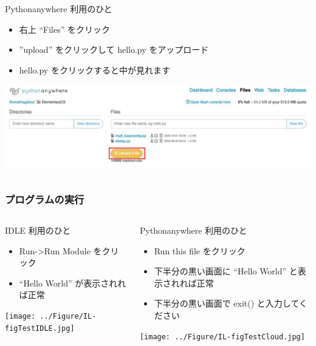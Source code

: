 \begin{frame}
\begin{columns}[t]
\begin{column}{0.5\textwidth}
\begin{itembox}{\footnotesize Pythonanywhere 利用のひと}
\begin{itemize}
\item 右上 ``Files'' をクリック
\item ''upload'' をクリックして hello.py をアップロード
\item hello.py をクリックすると中が見れます
        \end{itemize}
\includegraphics[width=1\textwidth]{./Figure/elementaryCS-figUpload.jpg}
      \end{itembox}
    \end{column}
  \end{columns}
\end{frame}
\begin{frame}
\frametitle{プログラムの実行}
  \begin{columns}[t]
    \begin{column}{0.5\textwidth}
      \begin{itembox}{\footnotesize IDLE 利用のひと}
        \begin{itemize}
\scriptsize
\item Run->Run Module をクリック
\item ``Hello World'' が表示されれば正常
        \end{itemize}
\texttt{[image: ../Figure/IL-figTestIDLE.jpg]}
      \end{itembox}
    \end{column}
    \begin{column}{0.5\textwidth}
      \begin{itembox}{\footnotesize Pythonanywhere 利用のひと}
\scriptsize
        \begin{itemize}
\item Run this file をクリック
\item 下半分の黒い画面に ``Hello World'' と表示されれば正常
\item 下半分の黒い画面で exit() と入力してください
        \end{itemize}
\texttt{[image: ../Figure/IL-figTestCloud.jpg]}
      \end{itembox}
    \end{column}
  \end{columns}
\end{frame}
